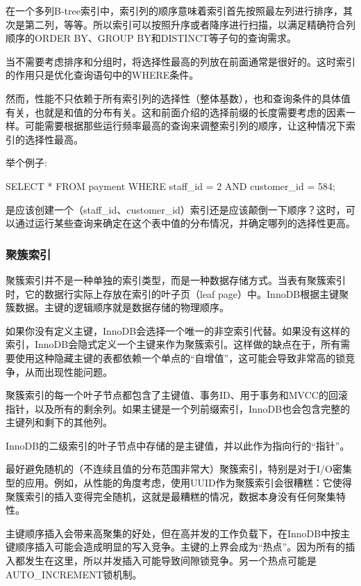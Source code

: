 在一个多列B-tree索引中，索引列的顺序意味着索引首先按照最左列进行排序，其次是第二列，等等。所以索引可以按照升序或者降序进行扫描，以满足精确符合列顺序的ORDER BY、GROUP BY和DISTINCT等子句的查询需求。

当不需要考虑排序和分组时，将选择性最高的列放在前面通常是很好的。这时索引的作用只是优化查询语句中的WHERE条件。

然而，性能不只依赖于所有索引列的选择性（整体基数），也和查询条件的具体值有关，也就是和值的分布有关。这和前面介绍的选择前缀的长度需要考虑的因素一样。可能需要根据那些运行频率最高的查询来调整索引列的顺序，让这种情况下索引的选择性最高。

举个例子:
\begin{sql}
SELECT * FROM payment WHERE staff_id = 2 AND customer_id = 584;
\end{sql}

是应该创建一个（staff\_id、customer\_id）索引还是应该颠倒一下顺序？这时，可以通过运行某些查询来确定在这个表中值的分布情况，并确定哪列的选择性更高。

\subsubsection{聚簇索引}

聚簇索引并不是一种单独的索引类型，而是一种数据存储方式。当表有聚簇索引时，它的数据行实际上存放在索引的叶子页（leaf page）中。InnoDB根据主键聚簇数据。主键的逻辑顺序就是数据存储的物理顺序。

如果你没有定义主键，InnoDB会选择一个唯一的非空索引代替。如果没有这样的索引，InnoDB会隐式定义一个主键来作为聚簇索引。这样做的缺点在于，所有需要使用这种隐藏主键的表都依赖一个单点的“自增值”，这可能会导致非常高的锁竞争，从而出现性能问题。

聚簇索引的每一个叶子节点都包含了主键值、事务ID、用于事务和MVCC的回滚指针，以及所有的剩余列。如果主键是一个列前缀索引，InnoDB也会包含完整的主键列和剩下的其他列。

InnoDB的二级索引的叶子节点中存储的是主键值，并以此作为指向行的“指针”。

最好避免随机的（不连续且值的分布范围非常大）聚簇索引，特别是对于I/O密集型的应用。例如，从性能的角度考虑，使用UUID作为聚簇索引会很糟糕：它使得聚簇索引的插入变得完全随机，这就是最糟糕的情况，数据本身没有任何聚集特性。

主键顺序插入会带来高聚集的好处，但在高并发的工作负载下，在InnoDB中按主键顺序插入可能会造成明显的写入竞争。主键的上界会成为“热点”。因为所有的插入都发生在这里，所以并发插入可能导致间隙锁竞争。另一个热点可能是AUTO\_INCREMENT锁机制。

